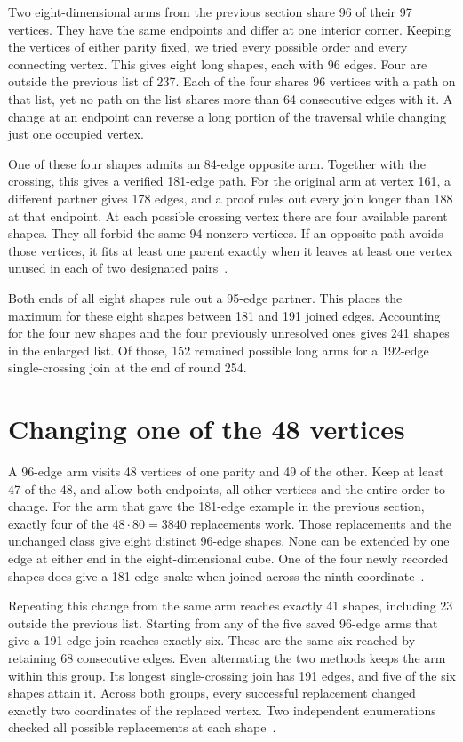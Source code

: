 \documentclass[11pt,a4paper]{article}
\begin{document}
Two eight-dimensional arms from the previous section share 96
of their 97 vertices. They have the same endpoints and differ at one
interior corner. Keeping the vertices of either parity fixed, we
tried every possible order and every connecting vertex. This gives
eight long shapes, each with 96 edges. Four are outside the previous
list of 237. Each of the four shares 96 vertices with a path on that
list, yet no path on the list shares more than 64 consecutive edges
with it. A change at an endpoint can reverse a long portion of the
traversal while changing just one occupied vertex.

One of these four shapes admits an 84-edge opposite arm. Together
with the crossing, this gives a verified 181-edge path. For the
original arm at vertex 161, a different partner gives 178 edges,
and a proof rules out every join longer than 188 at that endpoint. At each
possible crossing vertex there are four available parent shapes.
They all forbid the same 94 nonzero vertices. If an opposite path
avoids those vertices, it fits at least one parent exactly when it
leaves at least one vertex unused in each of two designated
pairs~\cite{distant254}.

Both ends of all eight shapes rule out a 95-edge partner. This
places the maximum for these eight shapes between 181 and 191 joined
edges. Accounting for the four new shapes and the four previously
unresolved ones gives 241 shapes in the enlarged list. Of those,
152 remained possible long arms for a 192-edge single-crossing join
at the end of round 254.

\section{Changing one of the 48 vertices}

A 96-edge arm visits 48 vertices of one parity and 49 of the other.
Keep at least 47 of the 48, and allow both endpoints, all other
vertices and the entire order to change. For the arm that gave the
181-edge example in the previous section, exactly four of the
$48\cdot80=3840$ replacements work. Those replacements and the
unchanged class give eight distinct 96-edge shapes. None can be
extended by one edge at either end in the eight-dimensional cube.
One of the four newly recorded shapes does give a 181-edge snake
when joined across the ninth coordinate~\cite{exchange255}.

Repeating this change from the same arm reaches exactly 41 shapes,
including 23 outside the previous list. Starting from any of the five
saved 96-edge arms that give a 191-edge join reaches exactly six. These are
the same six reached by retaining 68 consecutive edges. Even
alternating the two methods keeps the arm within this group. Its
longest single-crossing join has 191 edges, and five of the six
shapes attain it. Across both groups, every successful replacement
changed exactly two coordinates of the replaced vertex. Two
independent enumerations checked all possible replacements at each
shape~\cite{root248,repeat253,exchange255}.
\end{document}
